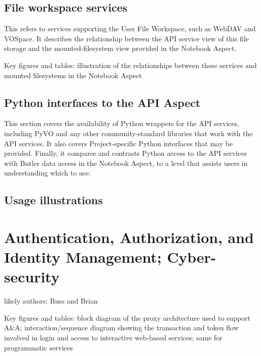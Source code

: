 \subsection{File workspace services}

This refers to services supporting the User File Workspace, such as WebDAV and VOSpace.  It describes the relationship between the API service view of this file storage and the mounted-filesystem view provided in the Notebook Aspect.

Key figures and tables: illustration of the relationships between these services and mounted filesystems in the Notebook Aspect

\subsection{Python interfaces to the API Aspect}

This section covers the availability of Python wrappers for the API services, including PyVO and any other community-standard libraries that work with the API services.  It also covers Project-specific Python interfaces that may be provided.  Finally, it compares and contrasts Python access to the API services with Butler data access in the Notebook Aspect, to a level that assists users in understanding which to use.

\subsection{Usage illustrations}


\section{Authentication, Authorization, and Identity Management; Cyber-security}

likely authors: Russ and Brian


Key figures and tables: block diagram of the proxy architecture used to support A\&A; interaction/sequence diagram showing the transaction and token flow involved in login and access to interactive web-based services; same for programmatic services

